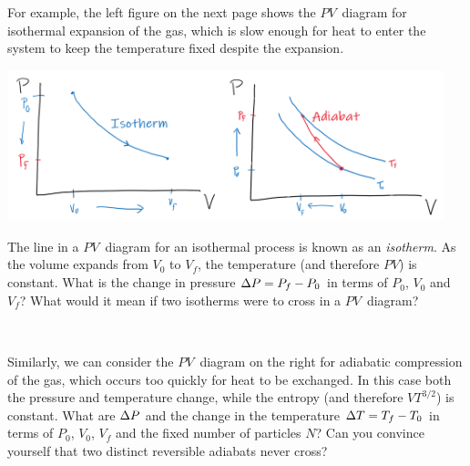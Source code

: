 For example, the left figure on the next page shows the $PV$~diagram for isothermal expansion of the gas, which is slow enough for heat to enter the system to keep the temperature fixed despite the expansion.
\begin{center} %
  \includegraphics[width=0.475\textwidth]{figs/unit05_isotherm.pdf}\hfill \includegraphics[width=0.475\textwidth]{figs/unit05_adiabat.pdf}
\end{center}
The line in a $PV$~diagram for an isothermal process is known as an \textit{isotherm}.
As the volume expands from $V_0$ to $V_f$, the temperature (and therefore $PV$) is constant.
What is the change in pressure $\Delta P = P_f - P_0$ in terms of $P_0$, $V_0$ and $V_f$?
What would it mean if two isotherms were to cross in a $PV$~diagram?
\begin{mdframed}
  \ \\[100 pt]
\end{mdframed}

Similarly, we can consider the $PV$~diagram on the right for adiabatic compression of the gas, which occurs too quickly for heat to be exchanged.
In this case both the pressure and temperature change, while the entropy (and therefore $VT^{3 / 2}$) is constant.
What are $\Delta P$ and the change in the temperature $\Delta T = T_f - T_0$ in terms of $P_0$, $V_0$, $V_f$ and the fixed number of particles $N$?
Can you convince yourself that two distinct reversible adiabats never cross? %
\begin{mdframed}
  \ \\[120 pt]
\end{mdframed}



